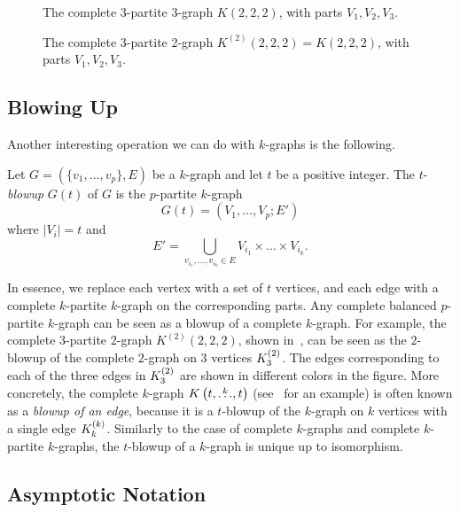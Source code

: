\begin{figure}[htbp]
    \centering
    
    \caption{The complete 3-partite 3-graph $K(2, 2, 2)$, with parts $V_1, V_2, V_3$.}
    \label{fig:222}
\end{figure}

\begin{figure}[htbp]
    \centering
    
    \caption{The complete 3-partite 2-graph $K^{(2)}(2, 2, 2) = K(2, 2, 2)$, with parts $V_1, V_2, V_3$.}
    \label{fig:k2_222}
\end{figure}

\subsection{Blowing Up} \label{subsec:blowup}
Another interesting operation we can do with $k$-graphs is the following.

\begin{definition}
    Let $G = (\{v_1, \dots, v_p\}, E)$ be a $k$-graph and let $t$ be a positive integer.
    The $t$-\emph{blowup} $G(t)$ of $G$ is the $p$-partite $k$-graph
    \[
        G(t) = (V_1, \dots, V_p; E')
    \]
    where $|V_i| = t$ and
    \[
        E' = \bigcup_{v_{i_1}, \dots, v_{i_k} \in E} V_{i_1} \times \dots \times V_{i_k}.
    \]
\end{definition}

In essence, we replace each vertex with a set of $t$ vertices, and each edge with a complete $k$-partite $k$-graph
on the corresponding parts.
Any complete balanced $p$-partite $k$-graph can be seen as a blowup of a complete $k$-graph.
For example, the complete $3$-partite $2$-graph $K^{(2)}(2, 2, 2)$, shown in~,
can be seen as the $2$-blowup of the complete $2$-graph on $3$ vertices $K^{(2)}_{3}$.
The edges corresponding to each of the three edges in $K^{(2)}_{3}$ are shown in different colors in the figure.
More concretely, the complete $k$-graph $K\left(t, \overset{k}{\dots}, t\right)$ (see~ for an example)
is often known as a \emph{blowup of an edge}, because it is a $t$-blowup of the
$k$-graph on $k$ vertices with a single edge $K^{(k)}_{k}$.
Similarly to the case of complete $k$-graphs and complete $k$-partite $k$-graphs,
the $t$-blowup of a $k$-graph is unique up to isomorphism.

\subsection{Asymptotic Notation}\label{subsec:asymptotic-notation} %

